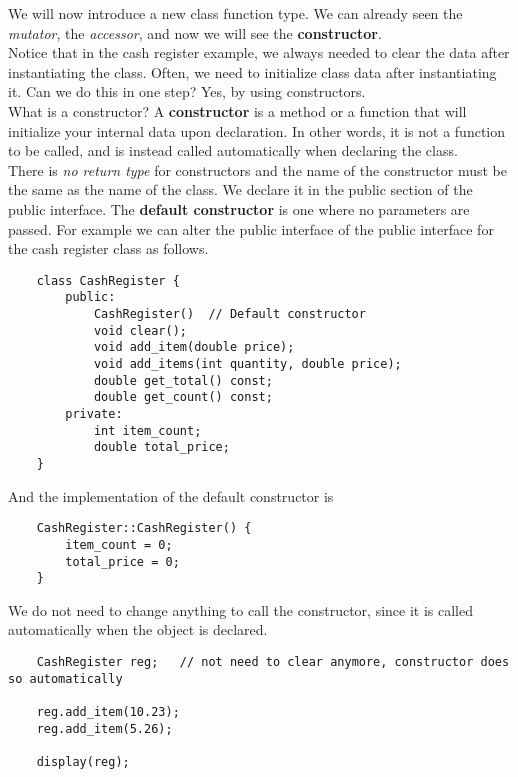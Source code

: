 \documentclass[]{article}
\begin{document}
We will now introduce a new class function type. We can already seen the \textit{mutator}, the \textit{accessor}, and now we will see the \textbf{constructor}.\\

Notice that in the cash register example, we always needed to clear the data after instantiating the class. Often, we need to initialize class data after instantiating it. Can we do this in one step? Yes, by using constructors.\\

What is a constructor? A \textbf{constructor} is a method or a function that will initialize your internal data upon declaration. In other words, it is not a function to be called, and is instead called automatically when declaring the class.\\

There is \textit{no return type} for constructors and the name of the constructor must be the same as the name of the class. We declare it in the public section of the public interface. The \textbf{default constructor} is one where no parameters are passed. For example we can alter the public interface of the public interface for the cash register class as follows.

\begin{lstlisting}
	class CashRegister {
		public:
			CashRegister() 	// Default constructor
			void clear();
			void add_item(double price);
			void add_items(int quantity, double price);
			double get_total() const;
			double get_count() const;
		private:
			int item_count;
			double total_price;
	}
\end{lstlisting}\bigbreak

And the implementation of the default constructor is 

\begin{lstlisting}
	CashRegister::CashRegister() {
		item_count = 0;
		total_price = 0;
	}
\end{lstlisting}\bigbreak

We do not need to change anything to call the constructor, since it is called automatically when the object is declared.\\

\begin{lstlisting}
	CashRegister reg;	// not need to clear anymore, constructor does so automatically
	
	reg.add_item(10.23);
	reg.add_item(5.26);
	
	display(reg); 
\end{lstlisting}\bigbreak
\end{document}
